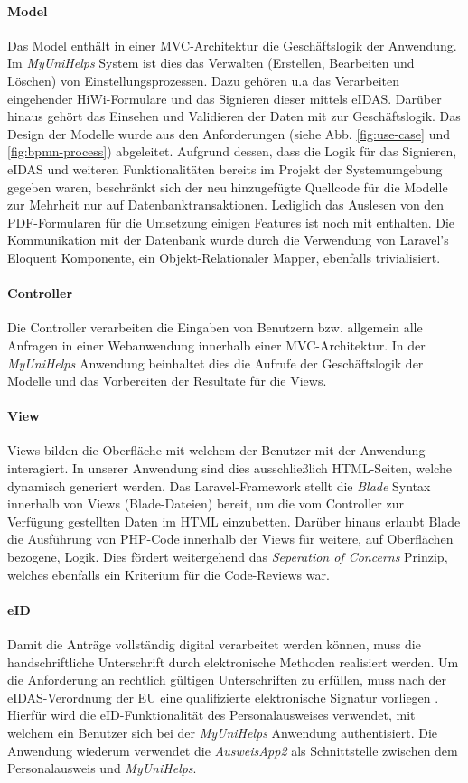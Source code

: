 \documentclass[12pt,a4paper]{scrartcl}
\newcommand{\italic}[1]{\textit{#1}}
\begin{document}
\paragraph{Model}
Das Model enthält in einer MVC-Architektur die Geschäftslogik der Anwendung.
Im \italic{MyUniHelps} System ist dies das Verwalten (Erstellen, Bearbeiten und Löschen) von Einstellungsprozessen.
Dazu gehören u.a das Verarbeiten eingehender HiWi-Formulare und das Signieren dieser mittels eIDAS.
Darüber hinaus gehört das Einsehen und Validieren der Daten mit zur Geschäftslogik.
Das Design der Modelle wurde aus den Anforderungen (siehe Abb. \ref{fig:use-case} und \ref{fig:bpmn-process}) abgeleitet.
Aufgrund dessen, dass die Logik für das Signieren, eIDAS und weiteren Funktionalitäten bereits im Projekt der Systemumgebung gegeben waren, beschränkt sich der neu hinzugefügte Quellcode für die Modelle zur Mehrheit nur auf Datenbanktransaktionen.
Lediglich das Auslesen von den PDF-Formularen für die Umsetzung einigen Features ist noch mit enthalten.
Die Kommunikation mit der Datenbank wurde durch die Verwendung von Laravel's Eloquent Komponente, ein Objekt-Relationaler Mapper, ebenfalls trivialisiert.

\paragraph{Controller}
Die Controller verarbeiten die Eingaben von Benutzern bzw. allgemein alle Anfragen in einer Webanwendung innerhalb einer MVC-Architektur.
In der \italic{MyUniHelps} Anwendung beinhaltet dies die Aufrufe der Geschäftslogik der Modelle und das Vorbereiten der Resultate für die Views.

\paragraph{View}
Views bilden die Oberfläche mit welchem der Benutzer mit der Anwendung interagiert.
In unserer Anwendung sind dies ausschließlich HTML-Seiten, welche dynamisch generiert werden.
Das Laravel-Framework stellt die \italic{Blade} Syntax innerhalb von Views (Blade-Dateien) bereit, um die vom Controller zur Verfügung gestellten Daten im HTML einzubetten.
Darüber hinaus erlaubt Blade die Ausführung von PHP-Code innerhalb der Views für weitere, auf Oberflächen bezogene, Logik.
Dies fördert weitergehend das \italic{Seperation of Concerns} Prinzip, welches ebenfalls ein Kriterium für die Code-Reviews war.

\paragraph{eID}
\label{eid}
Damit die Anträge vollständig digital verarbeitet werden können, muss die handschriftliche Unterschrift durch elektronische Methoden realisiert werden.
Um die Anforderung an rechtlich gültigen Unterschriften zu erfüllen, muss nach der eIDAS-Verordnung der EU eine qualifizierte elektronische Signatur vorliegen \cite{Dumortier.2016}.
Hierfür wird die eID-Funktionalität des Personalausweises verwendet, mit welchem ein Benutzer sich bei der \italic{MyUniHelps} Anwendung authentisiert.
Die Anwendung wiederum verwendet die \italic{AusweisApp2} als Schnittstelle zwischen dem Personalausweis und \italic{MyUniHelps}.
\end{document}
